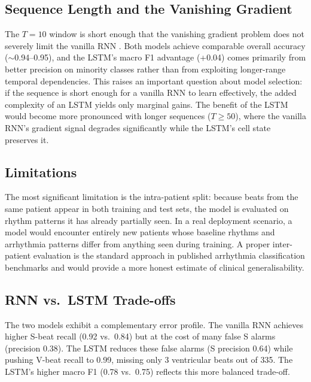 \documentclass[twocolumn, fontsize=10pt]{article}
\begin{document}
\subsection{Sequence Length and the Vanishing Gradient}

The $T = 10$ window is short enough that the vanishing gradient problem does not 
severely limit the vanilla RNN \citep{goodfellow2016deep}. Both models achieve 
comparable overall accuracy ($\sim$0.94--0.95), and the LSTM's macro F1 advantage 
(+0.04) comes primarily from better precision on minority classes rather than from 
exploiting longer-range temporal dependencies. This raises an important question 
about model selection: if the sequence is short enough for a vanilla RNN to learn 
effectively, the added complexity of an LSTM \citep{hochreiter1997lstm} yields only 
marginal gains. The benefit of the LSTM would become more pronounced with longer 
sequences ($T \geq 50$), where the vanilla RNN's gradient signal degrades 
significantly while the LSTM's cell state preserves it.

\subsection{Limitations}

The most significant limitation is the intra-patient split: because beats from the 
same patient appear in both training and test sets, the model is evaluated on rhythm 
patterns it has already partially seen. In a real deployment scenario, a model would 
encounter entirely new patients whose baseline rhythms and arrhythmia patterns differ 
from anything seen during training. A proper inter-patient evaluation is the standard 
approach in published arrhythmia classification benchmarks 
\citep{moody2001impact, rajpurkar2017cardiologist} and would provide a more honest 
estimate of clinical generalisability.


\subsection{RNN vs.\ LSTM Trade-offs}

The two models exhibit a complementary error profile. The vanilla RNN achieves higher
S-beat recall (0.92 vs.\ 0.84) but at the cost of many false S alarms
(precision 0.38). The LSTM reduces these false alarms (S precision 0.64) while
pushing V-beat recall to 0.99, missing only 3 ventricular beats out of 335.
The LSTM's higher macro F1 (0.78 vs.\ 0.75) reflects this more balanced trade-off.
\end{document}
